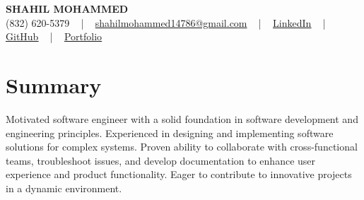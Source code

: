 \documentclass[letterpaper,10pt]{article}
\begin{document}
\begin{center}
    {\fontsize{14pt}{12pt}\selectfont \textbf{\MakeUppercase{Shahil Mohammed}}}\\ \vspace{2pt}
    \fontsize{10pt}{12pt}\selectfont (832) 620-5379 ~ | ~ \href{mailto:shahilmohammed14786@gmail.com}{shahilmohammed14786@gmail.com} ~ | ~  
    \href{https://www.linkedin.com/in/shahil-mohammed-9652931a1/}{\color{blue}\underline{LinkedIn}}  ~ | ~ 
    \href{https://github.com/freakbeast14}{\color{blue}\underline{GitHub}} ~ | ~ 
    \href{https://shahil-mohammed.netlify.app/}{\color{blue}\underline{Portfolio}}
    \vspace{-8pt}
\end{center}

\section{Summary}
\vspace{-2pt}\fontsize{8pt}{9pt}\selectfont
Motivated software engineer with a solid foundation in software development and engineering principles. Experienced in designing and implementing software solutions for complex systems. Proven ability to collaborate with cross-functional teams, troubleshoot issues, and develop documentation to enhance user experience and product functionality. Eager to contribute to innovative projects in a dynamic environment.

\vspace{-5pt}
 
\vspace{-2pt}
\end{document}
